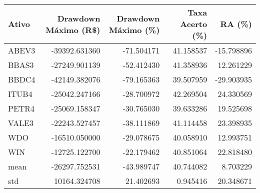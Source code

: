 \begin{tabular}{lrrrr}
\toprule
Ativo &  Drawdown Máximo (R\$) &  Drawdown Máximo (\%)  &      Taxa Acerto (\%) &  RA (\%) \\
\midrule
     ABEV3 &     -39392.631360 &                   -71.504171 & 41.158537 &          -15.798896 \\
     BBAS3 &     -27249.901139 &                   -52.412430 & 41.358936 &           12.261229 \\
     BBDC4 &     -42149.382076 &                   -79.165363 & 39.507959 &          -29.903935 \\
     ITUB4 &     -25042.247166 &                   -28.700972 & 42.269504 &           24.330569 \\
     PETR4 &     -25069.158347 &                   -30.765030 & 39.633286 &           19.525698 \\
     VALE3 &     -22243.527457 &                   -38.111869 & 41.114458 &           23.398935 \\
       WDO &     -16510.050000 &                   -29.078675 & 40.058910 &           12.993751 \\
       WIN &     -12725.122700 &                   -22.179462 & 40.851064 &           22.818480 \\
      mean &     -26297.752531 &                   -43.989747 & 40.744082 &            8.703229 \\
       std &      10164.324708 &                    21.402693 &  0.945416 &           20.348671 \\
\bottomrule
\end{tabular}
